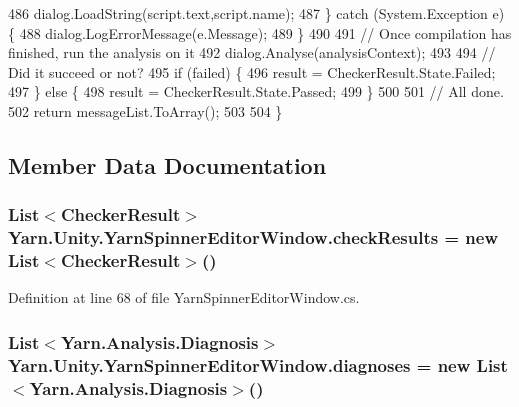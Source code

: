 \begin{DoxyCode}
486                 dialog.LoadString(script.text,script.name);
487             \} \textcolor{keywordflow}{catch} (System.Exception e) \{
488                 dialog.LogErrorMessage(e.Message);
489             \}
490 
491             \textcolor{comment}{// Once compilation has finished, run the analysis on it}
492             dialog.Analyse(analysisContext);
493 
494             \textcolor{comment}{// Did it succeed or not?}
495             \textcolor{keywordflow}{if} (failed) \{
496                 result = CheckerResult.State.Failed;
497             \} \textcolor{keywordflow}{else} \{
498                 result = CheckerResult.State.Passed;
499             \}
500 
501             \textcolor{comment}{// All done.}
502             \textcolor{keywordflow}{return} messageList.ToArray();
503 
504         \}
\end{DoxyCode}


\subsection{Member Data Documentation}
\hypertarget{a00188_aa85ab7bd194e5425b991b9c216d4d10e}{
\subsubsection[{check\-Results}]{\setlength{\rightskip}{0pt plus 5cm}List$<${\bf Checker\-Result}$>$ Yarn.\-Unity.\-Yarn\-Spinner\-Editor\-Window.\-check\-Results = new List$<${\bf Checker\-Result}$>$()\hspace{0.3cm}{\ttfamily [private]}}}\label{a00188_aa85ab7bd194e5425b991b9c216d4d10e}


Definition at line 68 of file Yarn\-Spinner\-Editor\-Window.\-cs.

\hypertarget{a00188_a25c92cbfdd09661a96714d05b14af886}{
\subsubsection[{diagnoses}]{\setlength{\rightskip}{0pt plus 5cm}List$<${\bf Yarn.\-Analysis.\-Diagnosis}$>$ Yarn.\-Unity.\-Yarn\-Spinner\-Editor\-Window.\-diagnoses = new List$<${\bf Yarn.\-Analysis.\-Diagnosis}$>$()\hspace{0.3cm}{\ttfamily [private]}}}\label{a00188_a25c92cbfdd09661a96714d05b14af886}


